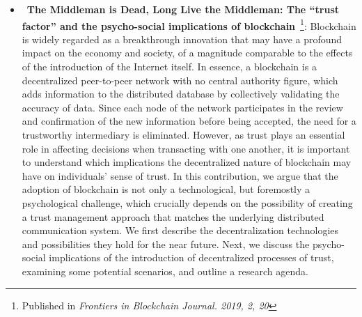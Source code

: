 \begin{itemize}

    \item{~\textbf{The Middleman is Dead, Long Live the Middleman: The “trust factor” and the psycho-social implications of blockchain}~\cite{gaggioli2019middleman}}\footnote{Published in \textit{Frontiers in Blockchain Journal. 2019, 2, 20}}: Blockchain is widely regarded as a breakthrough innovation that may have a profound impact on the economy and society, of a magnitude comparable to the effects of the introduction of the Internet itself. In essence, a blockchain is a decentralized peer-to-peer network with no central authority figure, which adds information to the distributed database by collectively validating the accuracy of data. Since each node of the network participates in the review and confirmation of the new information before being accepted, the need for a trustworthy intermediary is eliminated. However, as trust plays an essential role in affecting decisions when transacting with one another, it is important to understand which implications the decentralized nature of blockchain may have on individuals' sense of trust. In this contribution, we argue that the adoption of blockchain is not only a technological, but foremostly a psychological challenge, which crucially depends on the possibility of creating a trust management approach that matches the underlying distributed communication system. We first describe the decentralization technologies and possibilities they hold for the near future. Next, we discuss the psycho-social implications of the introduction of decentralized processes of trust, examining some potential scenarios, and outline a research agenda.


\end{itemize}
